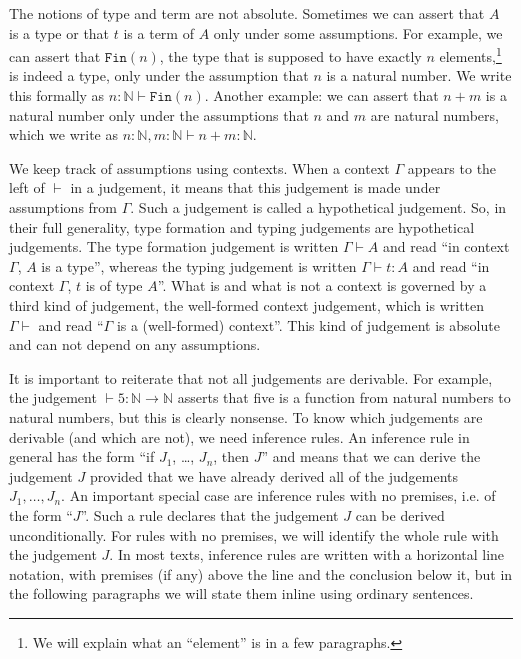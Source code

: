 \documentclass[declaration,mgr,english,shortabstract]{iithesis}
\newcommand{\m}[1]{\texttt{#1}}
\newcommand{\context}[1]{#1 \vdash}
\newcommand{\type}[2]{#1 \vdash #2}
\newcommand{\term}[3]{#1 \vdash #2 : #3}
\newcommand{\N}{\mathbb{N}}
\newcommand{\Fin}[1]{\m{Fin}(#1)}
\begin{document}
The notions of type and term are not absolute. Sometimes we can assert that $A$ is a type or that $t$ is a term of $A$ only under some assumptions. For example, we can assert that $\Fin{n}$, the type that is supposed to have exactly $n$ elements,\footnote{We will explain what an ``element'' is in a few paragraphs.} is indeed a type, only under the assumption that $n$ is a natural number. We write this formally as $\type{n : \N}{\Fin{n}}$. Another example: we can assert that $n + m$ is a natural number only under the assumptions that $n$ and $m$ are natural numbers, which we write as $\term{n : \N, m : \N}{n + m}{\N}$.

We keep track of assumptions using contexts. When a context $\Gamma$ appears to the left of $\vdash$ in a judgement, it means that this judgement is made under assumptions from $\Gamma$. Such a judgement is called a hypothetical judgement. So, in their full generality, type formation and typing judgements are hypothetical judgements. The type formation judgement is written $\type{\Gamma}{A}$ and read ``in context $\Gamma$, $A$ is a type'', whereas the typing judgement is written $\term{\Gamma}{t}{A}$ and read ``in context $\Gamma$, $t$ is of type $A$''. What is and what is not a context is governed by a third kind of judgement, the well-formed context judgement, which is written $\context{\Gamma}$ and read ``$\Gamma$ is a (well-formed) context''. This kind of judgement is absolute and can not depend on any assumptions.

It is important to reiterate that not all judgements are derivable. For example, the judgement $\term{}{5}{\N \to \N}$ asserts that five is a function from natural numbers to natural numbers, but this is clearly nonsense. To know which judgements are derivable (and which are not), we need inference rules. An inference rule in general has the form ``if $J_1$, \dots, $J_n$, then $J$'' and means that we can derive the judgement $J$ provided that we have already derived all of the judgements $J_1, \dots, J_n$. An important special case are inference rules with no premises, i.e. of the form ``$J$''. Such a rule declares that the judgement $J$ can be derived unconditionally. For rules with no premises, we will identify the whole rule with the judgement $J$. In most texts, inference rules are written with a horizontal line notation, with premises (if any) above the line and the conclusion below it, but in the following paragraphs we will state them inline using ordinary sentences.
\end{document}
